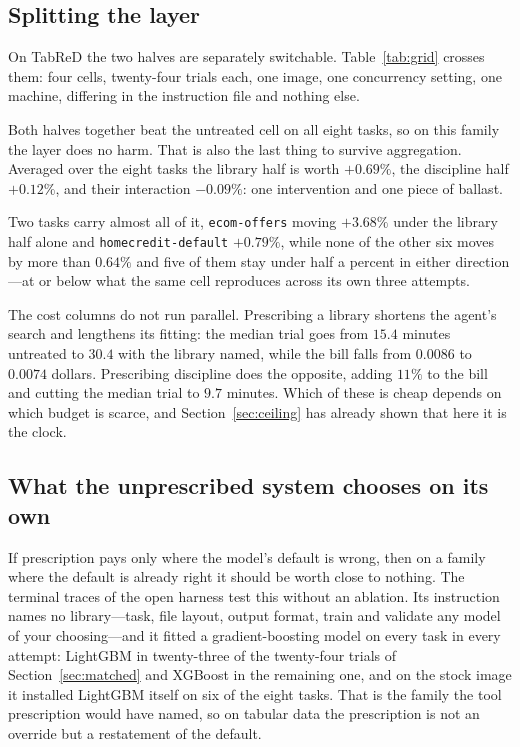 \subsection{Splitting the layer}
\label{sec:grid}

On TabReD the two halves are separately switchable. Table~\ref{tab:grid} crosses
them: four cells, twenty-four trials each, one image, one concurrency setting,
one machine, differing in the instruction file and nothing else.



Both halves together beat the untreated cell on all eight tasks, so on this
family the layer does no harm. That is also the last thing to survive
aggregation. Averaged over the eight tasks the library half is worth $+0.69\%$,
the discipline half $+0.12\%$, and their interaction $-0.09\%$: one intervention
and one piece of ballast.
\begin{sloppypar}
Two tasks carry almost all of it, \texttt{ecom-offers} moving $+3.68\%$ under the
library half alone and \texttt{homecredit-default} $+0.79\%$, while none of the
other six moves by more than $0.64\%$ and five of them stay under half a
percent in either direction---at or below what the same cell reproduces across
its own three attempts.
\end{sloppypar}

The cost columns do not run parallel. Prescribing a library shortens the agent's
search and lengthens its fitting: the median trial goes from $15.4$ minutes
untreated to $30.4$ with the library named, while the bill falls from $0.0086$ to
$0.0074$ dollars. Prescribing discipline does the opposite, adding $11\%$ to the
bill and cutting the median trial to $9.7$ minutes. Which of these is cheap
depends on which budget is scarce, and Section~\ref{sec:ceiling} has already
shown that here it is the clock.

\subsection{What the unprescribed system chooses on its own}
\label{sec:spontaneous}

If prescription pays only where the model's default is wrong, then on a family
where the default is already right it should be worth close to nothing. The
terminal traces of the open harness test this without an ablation. Its
instruction names no library---task, file layout, output format, train and
validate any model of your choosing---and it fitted a gradient-boosting model on
every task in every attempt: LightGBM in twenty-three of the twenty-four trials
of Section~\ref{sec:matched} and XGBoost in the remaining one, and on the stock
image it installed LightGBM itself on six of the eight tasks. That is the family
the tool prescription would have named, so on tabular data the prescription is
not an override but a restatement of the default.

